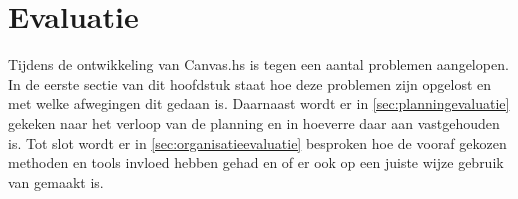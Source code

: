 \chapter{Evaluatie} \label{hoofdstuk:evaluatie}
Tijdens de ontwikkeling van Canvas.hs is tegen een aantal problemen aangelopen. In de eerste sectie van dit hoofdstuk staat hoe deze problemen zijn opgelost en met welke afwegingen dit gedaan is. Daarnaast wordt er in \autoref{sec:planningevaluatie} gekeken naar het verloop van de planning en in hoeverre daar aan vastgehouden is. Tot slot wordt er in \autoref{sec:organisatieevaluatie} besproken hoe de vooraf gekozen methoden en tools invloed hebben gehad en of er ook op een juiste wijze gebruik van gemaakt is.




